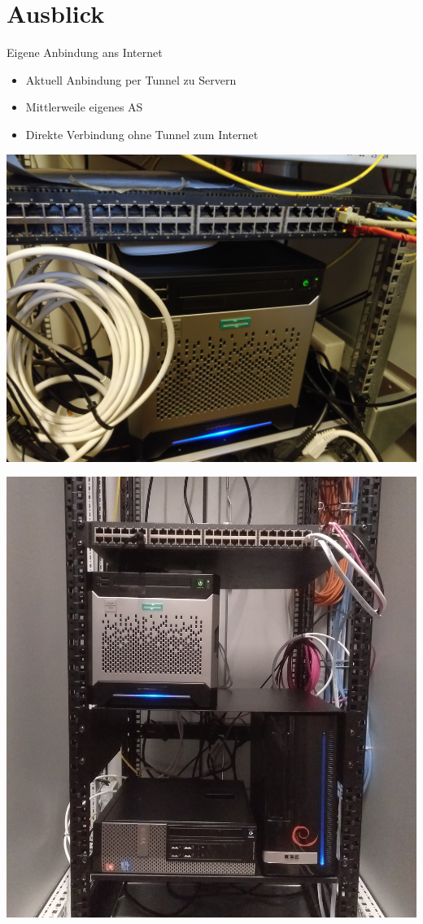 \documentclass{beamer}
\begin{document}

	\section{Ausblick}
	\begin{frame}{Eigene Anbindung ans Internet}
		\begin{itemize}
			\item Aktuell Anbindung per Tunnel zu Servern
			\item Mittlerweile eigenes AS
			\item Direkte Verbindung ohne Tunnel zum Internet
		\end{itemize}
	\end{frame}
	\begin{frame}
		\centering
		\includegraphics[width=\framewidth]{media/zbau-server.jpg}
	\end{frame}
	\begin{frame}
		\centering
		\includegraphics[height=\textheight]{media/zbau-server-neu.jpg}
	\end{frame}
\end{document}
